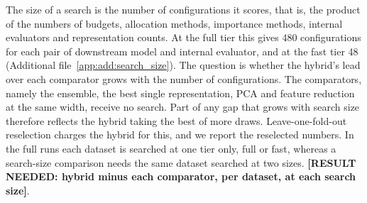 The size of a search is the number of configurations it scores, that is, the product of the numbers of budgets, allocation methods, importance methods, internal evaluators and representation counts. At the full tier this gives 480 configurations for each pair of downstream model and internal evaluator, and at the fast tier 48 (Additional file~\ref{app:add:search_size}). The question is whether the hybrid's lead over each comparator grows with the number of configurations. The comparators, namely the ensemble, the best single representation, PCA and feature reduction at the same width, receive no search. Part of any gap that grows with search size therefore reflects the hybrid taking the best of more draws. Leave-one-fold-out reselection charges the hybrid for this, and we report the reselected numbers. In the full runs each dataset is searched at one tier only, full or fast, whereas a search-size comparison needs the same dataset searched at two sizes. \textbf{[RESULT NEEDED: hybrid minus each comparator, per dataset, at each search size]}.

